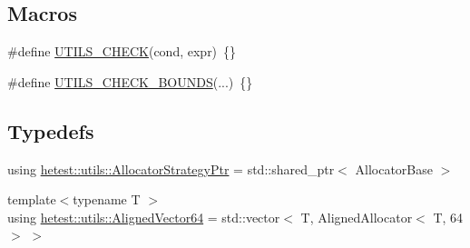 \subsection*{Macros}
\begin{DoxyCompactItemize}
\item 
\#define \hyperlink{utils-test_8hpp_a89535bd3a3a7e4e8d10037287f44b363}{U\-T\-I\-L\-S\-\_\-\-C\-H\-E\-C\-K}(cond, expr)~\{\}
\item 
\#define \hyperlink{utils-test_8hpp_a211847bac88927d6b3426fc78dc052be}{U\-T\-I\-L\-S\-\_\-\-C\-H\-E\-C\-K\-\_\-\-B\-O\-U\-N\-D\-S}(...)~\{\}
\end{DoxyCompactItemize}
\subsection*{Typedefs}
\begin{DoxyCompactItemize}
\item 
using \hyperlink{namespacehetest_1_1utils_a3f7f347b9f62a88014bdcc45f7987846}{hetest\-::utils\-::\-Allocator\-Strategy\-Ptr} = std\-::shared\-\_\-ptr$<$ Allocator\-Base $>$
\item 
{\footnotesize template$<$typename T $>$ }\\using \hyperlink{namespacehetest_1_1utils_ad5b6a78d49dc8f6790f7fd2b10bf3db0}{hetest\-::utils\-::\-Aligned\-Vector64} = std\-::vector$<$ T, Aligned\-Allocator$<$ T, 64 $>$ $>$
\end{DoxyCompactItemize}
